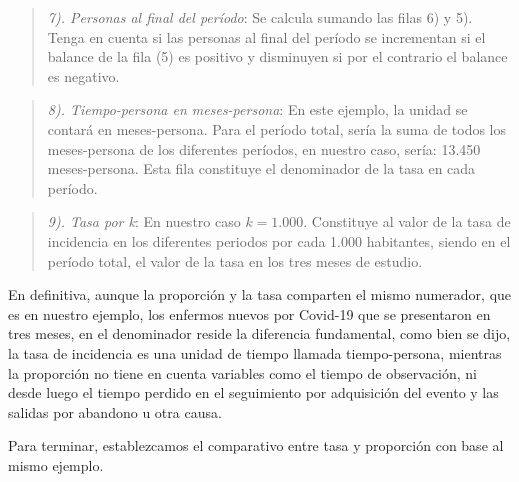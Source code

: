 \documentclass[
  11pt,
]{book}
\begin{document}
\begin{quote}
\emph{7). Personas al final del período}: Se calcula sumando las filas 6) y 5). Tenga en cuenta si las personas al final del período se incrementan si el balance de la fila (5) es positivo y disminuyen si por el contrario el balance es negativo.
\end{quote}

\begin{quote}
\emph{8). Tiempo-persona en meses-persona}: En este ejemplo, la unidad se contará en meses-persona. Para el período total, sería la suma de todos los meses-persona de los diferentes períodos, en nuestro caso, sería: 13.450 meses-persona. Esta fila constituye el denominador de la tasa en cada período.
\end{quote}

\begin{quote}
\emph{9). Tasa por k}: En nuestro caso \(k=1.000\). Constituye al valor de la tasa de incidencia en los diferentes periodos por cada 1.000 habitantes, siendo en el período total, el valor de la tasa en los tres meses de estudio.
\end{quote}

En definitiva, aunque la proporción y la tasa comparten el mismo numerador, que es en nuestro ejemplo, los enfermos nuevos por Covid-19 que se presentaron en tres meses, en el denominador reside la diferencia fundamental, como bien se dijo, la tasa de incidencia es una unidad de tiempo llamada tiempo-persona, mientras la proporción no tiene en cuenta variables como el tiempo de observación, ni desde luego el tiempo perdido en el seguimiento por adquisición del evento y las salidas por abandono u otra causa.

Para terminar, establezcamos el comparativo entre tasa y proporción con base al mismo ejemplo.
\end{document}
